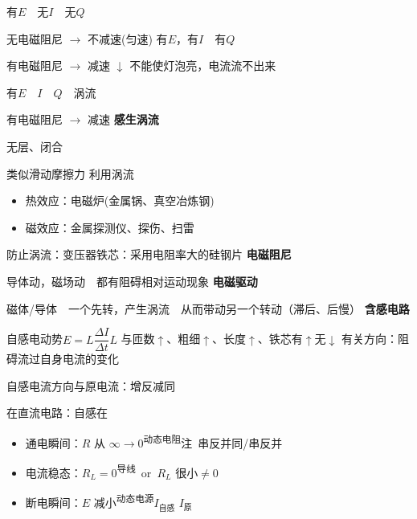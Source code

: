 有$E$　无$I$　无$Q$

无电磁阻尼 $\to$ 不减速(匀速)
有$E$，有$I$　有$Q$

有电磁阻尼 $\to$ 减速
$\downarrow$ 不能使灯泡亮，电流流不出来

有$E$　$I$　$Q$　涡流

有电磁阻尼 $\to$ 减速
\textbf{感生涡流}

无层、闭合

类似滑动摩擦力
利用涡流
\begin{itemize}
  \item 热效应：电磁炉(金属锅、真空冶炼钢)
  \item 磁效应：金属探测仪、探伤、扫雷
\end{itemize}
防止涡流：变压器铁芯：采用电阻率大的硅钢片
\textbf{电磁阻尼}

导体动，磁场动　都有阻碍相对运动现象
\textbf{电磁驱动}

磁体/导体　一个先转，产生涡流　从而带动另一个转动（滞后、后慢）
\textbf{含感电路}

\noindent 自感电动势\quad $E=L\dfrac{\Delta I}{\Delta t}$\quad $L$ 与匝数$\uparrow$、粗细$\uparrow$、长度$\uparrow$、铁芯有$\uparrow$无$\downarrow$ 有关\quad 方向：阻碍流过自身电流的变化%

\noindent\hspace*{4em}自感电流方向与原电流：增反减同

\noindent 在直流电路：自感在
\begin{itemize}
\item 通电瞬间：$R$ 从 $\infty\to0$\textsuperscript{动态电阻}\quad 注\ 串反并同/串反并
\item 电流稳态：$R_L=0$\textsuperscript{导线}\ or\ $R_L$ 很小$\neq0$
\item 断电瞬间：$E$ 减小\textsuperscript{动态电源}\quad $I_{\text{自感}}$ \unclear{$\le$} $I_{\text{原}}$
\end{itemize}

